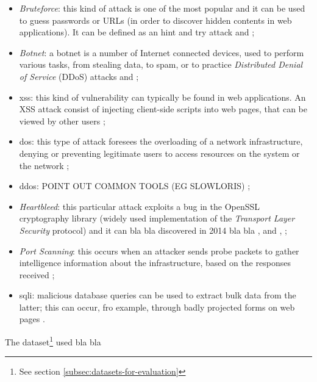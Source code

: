 \begin{itemize}
    \item[\faCaretRight] \textit{Bruteforce}: this kind of attack is one of the most popular and it can be used to guess passwords or URLs (in order to discover hidden contents in web applications). It can be defined as an hint and try attack \cite{icissp18} and \cite[p.~43]{Sharafaldin2019};
    \item[\faCaretRight] \textit{Botnet}: a botnet is a number of Internet connected devices, used to perform various tasks, from stealing data, to spam, or to practice \textit{Distributed Denial of Service} (DDoS) attacks \cite{icissp18} and \cite[p.~222]{Sharafaldin2019};
    \item[\faCaretRight] \gls{xss}: this kind of vulnerability can typically be found in web applications. An XSS attack consist of injecting client-side scripts into web pages, that can be viewed by other users \cite[p.~387]{Sharafaldin2019};
    \item[\faCaretRight] \gls{dos}: this type of attack foresees the overloading of a network infrastructure, denying or preventing legitimate users to access resources on the system or the network \cite[p.~241]{Sharafaldin2019};
    \item[\faCaretRight] \gls{ddos}: POINT OUT COMMON TOOLS (EG SLOWLORIS) \cite[p.~241]{Sharafaldin2019};
    \item[\faCaretRight] \textit{Heartbleed}: this particular attack exploits a bug in the OpenSSL cryptography library (widely used implementation of the \textit{Transport Layer Security} protocol) and it can bla bla discovered in 2014 bla bla \cite{icissp18}, \cite{Carvalho2014} and \cite{Stallings2014}, \cite[p.~706]{Sharafaldin2019};
    \item[\faCaretRight] \textit{Port Scanning}: this occurs when an attacker sends probe packets to gather intelligence information about the infrastructure, based on the responses received \cite[p.~294]{Sharafaldin2019};
    \item[\faCaretRight] \gls{sqli}: malicious database queries can be used to extract bulk data from the latter; this can occur, fro example, through badly projected forms on web pages \cite[p.~163]{Sharafaldin2019}.
\end{itemize}
The dataset\footnote{See section \ref{subsec:datasets-for-evaluation}} used bla bla


